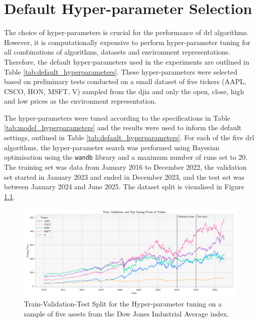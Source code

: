 \chapter{Default Hyper-parameter Selection} \label{app:experiment_hyperparameters}

The choice of hyper-parameters is crucial for the performance of \acrshort{drl} algorithms. However, it is computationally expensive to perform hyper-parameter tuning for all combinations of algorithms, datasets and environment representations. Therefore, the default hyper-parameters used in the experiments are outlined in Table \ref{tab:default_hyperparameters}. These hyper-parameters were selected based on preliminary tests conducted on a small dataset of five tickers (AAPL, CSCO, HON, MSFT, V) sampled from the \acrshort{djia} and only the open, close, high and low prices as the environment representation.

The hyper-parameters were tuned according to the specifications in Table \ref{tab:model_hyperparameters} and the results were used to inform the default settings, outlined in Table \ref{tab:default_hyperparameters}. For each of the five \acrshort{drl} algorithms, the hyper-parameter search was performed using Bayesian optimisation using the \texttt{wandb} library and a maximum number of runs set to 20. The training set was data from January 2016 to December 2022, the validation set started in January 2023 and ended in December 2023, and the test set was between January 2024 and June 2025. The dataset split is visualised in Figure \ref{fig:dataset_split}. 

\begin{figure}[h]
    \centering
    \includegraphics[width=\textwidth]{figures/dataset_split.png}
    \caption{Train-Validation-Test Split for the Hyper-parameter tuning on a sample of five assets from the Dow Jones Industrial Average index.}
    \label{fig:dataset_split}
\end{figure}

